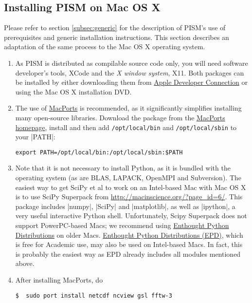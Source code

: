 \documentclass[11pt,final]{amsart}
\begin{document}
\clearpage
\subsection{Installing PISM on Mac OS X}  \label{subsec:macosx}

Please refer to section \ref{subsec:generic} for the description of PISM's use of prerequisites and generic installation
instructions. This section describes an adaptation of the same process to the Mac OS X operating system.

\begin{enumerate}
\item As PISM is distributed as compilable source code only, you will need software developer's tools, XCode and the \emph{X
    window system}, X11. Both packages can be installed by either downloading them from
  \href{http://developer.apple.com/tools/xcode/}{Apple Developer Connection} or using the Mac OS X installation DVD.
\item The use of \href{http://www.macports.org/}{MacPorts} is recommended, as it significantly simplifies installing many
  open-source libraries. Download the package from the \href{http://www.macports.org/install.php}{MacPorts homepage}, install and
  then add \verb|/opt/local/bin| and \verb|/opt/local/sbin| to your |PATH|:
\begin{verbatim}
export PATH=/opt/local/bin:/opt/local/sbin:$PATH
\end{verbatim}
\item Note that it is not necessary to install Python, as it is bundled with the operating system (as are BLAS, LAPACK, OpenMPI and
  Subversion). The easiest way to get SciPy et al to work on an Intel-based Mac with Mac OS X is to use SciPy Superpack from
  \url{http://macinscience.org/?page_id=6/}. This package includes |numpy|, |SciPy| and |matplotlib|, as well as |ipython|, a very useful
  interactive Python shell. Unfortunately, Scipy Superpack does not support PowerPC-based Macs; we recommend using \href{http://www.enthought.com/}{Enthought Python Distributions} on older Macs. \href{http://www.enthought.com/}{Enthought Python Distributions (EPD)}, which is free for Academic use, may also be used on Intel-based Macs. In fact, this is probably the easiest way as EPD already includes all modules mentioned above.
\item After installing MacPorts, do
\begin{verbatim}
$  sudo port install netcdf ncview gsl fftw-3
\end{verbatim}

\end{enumerate}
\end{document}
